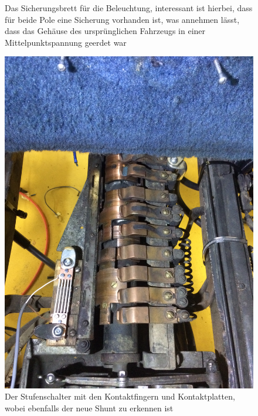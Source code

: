 \begin{landscape}
\begin{figure}[h]
	\caption{Das Sicherungsbrett für die Beleuchtung, interessant ist hierbei, dass für beide Pole eine Sicherung vorhanden ist, was annehmen lässt, dass das Gehäuse des ursprünglichen Fahrzeugs in einer Mittelpunktspannung geerdet war}
	\label{fig:Sicherungsbrett_Beleuchtung}
\end{figure}
\begin{figure}[h]
	\centering
		\includegraphics[width=1.30\textwidth]{images/Anhang/Stufenschalter.jpg}
	\caption{Der Stufenschalter mit den Kontaktfingern und Kontaktplatten, wobei ebenfalls der neue Shunt zu erkennen ist}
	\label{fig:Stufenschalter_Anhang}
\end{figure}
\begin{figure}[h]
	\centering

\end{figure}
\end{landscape}
